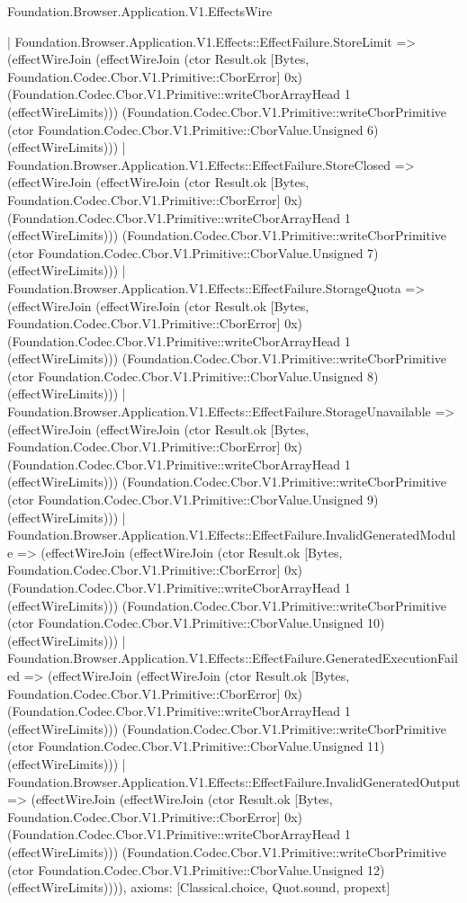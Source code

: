 \begin{lexlean}{Foundation.Browser.Application.V1.EffectsWire}
\begin{semanticmodule}
{    | Foundation.Browser.Application.V1.Effects::EffectFailure.StoreLimit => (effectWireJoin (effectWireJoin (ctor Result.ok [Bytes, Foundation.Codec.Cbor.V1.Primitive::CborError] 0x) (Foundation.Codec.Cbor.V1.Primitive::writeCborArrayHead 1 (effectWireLimits))) (Foundation.Codec.Cbor.V1.Primitive::writeCborPrimitive (ctor Foundation.Codec.Cbor.V1.Primitive::CborValue.Unsigned 6) (effectWireLimits)))
    | Foundation.Browser.Application.V1.Effects::EffectFailure.StoreClosed => (effectWireJoin (effectWireJoin (ctor Result.ok [Bytes, Foundation.Codec.Cbor.V1.Primitive::CborError] 0x) (Foundation.Codec.Cbor.V1.Primitive::writeCborArrayHead 1 (effectWireLimits))) (Foundation.Codec.Cbor.V1.Primitive::writeCborPrimitive (ctor Foundation.Codec.Cbor.V1.Primitive::CborValue.Unsigned 7) (effectWireLimits)))
    | Foundation.Browser.Application.V1.Effects::EffectFailure.StorageQuota => (effectWireJoin (effectWireJoin (ctor Result.ok [Bytes, Foundation.Codec.Cbor.V1.Primitive::CborError] 0x) (Foundation.Codec.Cbor.V1.Primitive::writeCborArrayHead 1 (effectWireLimits))) (Foundation.Codec.Cbor.V1.Primitive::writeCborPrimitive (ctor Foundation.Codec.Cbor.V1.Primitive::CborValue.Unsigned 8) (effectWireLimits)))
    | Foundation.Browser.Application.V1.Effects::EffectFailure.StorageUnavailable => (effectWireJoin (effectWireJoin (ctor Result.ok [Bytes, Foundation.Codec.Cbor.V1.Primitive::CborError] 0x) (Foundation.Codec.Cbor.V1.Primitive::writeCborArrayHead 1 (effectWireLimits))) (Foundation.Codec.Cbor.V1.Primitive::writeCborPrimitive (ctor Foundation.Codec.Cbor.V1.Primitive::CborValue.Unsigned 9) (effectWireLimits)))
    | Foundation.Browser.Application.V1.Effects::EffectFailure.InvalidGeneratedModule => (effectWireJoin (effectWireJoin (ctor Result.ok [Bytes, Foundation.Codec.Cbor.V1.Primitive::CborError] 0x) (Foundation.Codec.Cbor.V1.Primitive::writeCborArrayHead 1 (effectWireLimits))) (Foundation.Codec.Cbor.V1.Primitive::writeCborPrimitive (ctor Foundation.Codec.Cbor.V1.Primitive::CborValue.Unsigned 10) (effectWireLimits)))
    | Foundation.Browser.Application.V1.Effects::EffectFailure.GeneratedExecutionFailed => (effectWireJoin (effectWireJoin (ctor Result.ok [Bytes, Foundation.Codec.Cbor.V1.Primitive::CborError] 0x) (Foundation.Codec.Cbor.V1.Primitive::writeCborArrayHead 1 (effectWireLimits))) (Foundation.Codec.Cbor.V1.Primitive::writeCborPrimitive (ctor Foundation.Codec.Cbor.V1.Primitive::CborValue.Unsigned 11) (effectWireLimits)))
    | Foundation.Browser.Application.V1.Effects::EffectFailure.InvalidGeneratedOutput => (effectWireJoin (effectWireJoin (ctor Result.ok [Bytes, Foundation.Codec.Cbor.V1.Primitive::CborError] 0x) (Foundation.Codec.Cbor.V1.Primitive::writeCborArrayHead 1 (effectWireLimits))) (Foundation.Codec.Cbor.V1.Primitive::writeCborPrimitive (ctor Foundation.Codec.Cbor.V1.Primitive::CborValue.Unsigned 12) (effectWireLimits)))),
  axioms: [Classical.choice, Quot.sound, propext]
}


\end{semanticmodule}
\end{lexlean}
